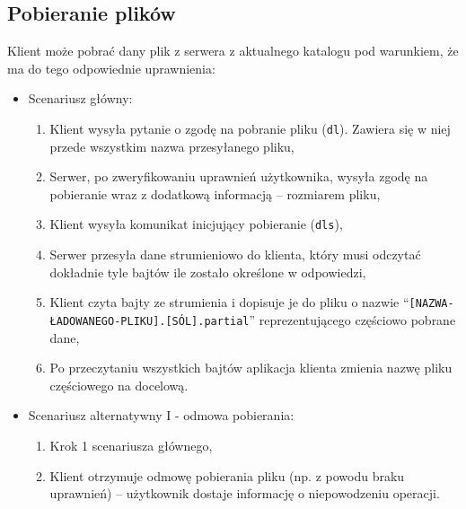 \documentclass[10pt,a4paper]{article}
\newcommand{\quotes}[1]{``#1''}
\begin{document}
\subsection{Pobieranie plików}
\noindent Klient może pobrać dany plik z serwera z aktualnego katalogu pod warunkiem, że ma do tego odpowiednie uprawnienia:
\begin{itemize}
    \item Scenariusz główny:
    \begin{enumerate}
        \item Klient wysyła pytanie o zgodę na pobranie pliku (\texttt{dl}). Zawiera się w niej przede wszystkim nazwa przesyłanego pliku,
        \item Serwer, po zweryfikowaniu uprawnień użytkownika, wysyła zgodę na pobieranie wraz z dodatkową informacją -- rozmiarem pliku,
        \item Klient wysyła komunikat inicjujący pobieranie (\texttt{dls}),
        \item Serwer przesyła dane strumieniowo do klienta, który musi odczytać dokładnie tyle bajtów ile zostało określone w odpowiedzi,
        \item Klient czyta bajty ze strumienia i dopisuje je do pliku o nazwie \quotes{\texttt{[NAZWA-ŁADOWANEGO-PLIKU].[SÓL].partial}} reprezentującego częściowo pobrane dane,
        \item Po przeczytaniu wszystkich bajtów aplikacja klienta zmienia nazwę pliku częściowego na docelową.
    \end{enumerate}

    \item Scenariusz alternatywny I - odmowa pobierania:
    \begin{enumerate}
        \item Krok 1 scenariusza głównego,
        \item Klient otrzymuje odmowę pobierania pliku (np. z powodu braku uprawnień) -- użytkownik dostaje informację o niepowodzeniu operacji.
    \end{enumerate}


\end{itemize}
\end{document}
